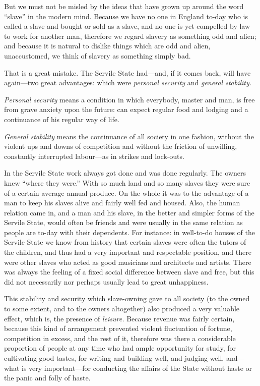 \documentclass{book}
\begin{document}
But we must not be misled by the ideas that have grown up around the word “slave” in the modern mind. Because we have no one in England to-day who is called a slave and bought or sold as a slave, and no one is yet compelled by law to work for another man, therefore we regard slavery as something odd and alien; and because it is natural to dislike things which are odd and alien, unaccustomed, we think of slavery as something simply bad.

That is a great mistake. The Servile State had—and, if it comes back, will have again—two great advantages: which were \emph{personal security} and \emph{general stability.}

\emph{Personal security} means a condition in which everybody, master and man, is free from grave anxiety upon the future: can expect regular food and lodging and a continuance of his regular way of life.

\emph{General stability} means the continuance of all society in one fashion, without the violent ups and downs of competition and without the friction of unwilling, constantly interrupted labour—as in strikes and lock-outs.

In the Servile State work always got done and was done regularly. The owners knew “where they were.” With so much land and so many slaves they were sure of a certain average annual produce. On the whole it was to the advantage of a man to keep his slaves alive and fairly well fed and housed. Also, the human relation came in, and a man and his slave, in the better and simpler forms of the Servile State, would often be friends and were usually in the same relation as people are to-day with their dependents. For instance: in well-to-do houses of the Servile State we know from history that certain slaves were often the tutors of the children, and thus had a very important and respectable position, and there were other slaves who acted as good musicians and architects and artists. There was always the feeling of a fixed social difference between slave and free, but this did not necessarily nor perhaps usually lead to great unhappiness.

This stability and security which slave-owning gave to all society (to the owned to some extent, and to the owners altogether) also produced a very valuable effect, which is, the presence of \emph{leisure.} Because revenue was fairly certain, because this kind of arrangement prevented violent fluctuation of fortune, competition in excess, and the rest of it, therefore was there a considerable proportion of people at any time who had ample opportunity for study, for cultivating good tastes, for writing and building well, and judging well, and—what is very important—for conducting the affairs of the State without haste or the panic and folly of haste.
\end{document}
